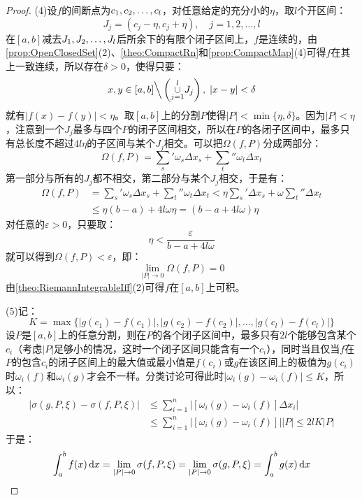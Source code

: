 \begin{proof}
	(4)设$f$的间断点为$c_1, c_2, \dots, c_{l}$，对任意给定的充分小的$\eta$，取$l$个开区间：
	\begin{equation*}
		J_j=(c_j-\eta,c_j+\eta),\quad j=1,2,\dots,l
	\end{equation*}
	在$[a,b]$减去$J_1, J_2, \dots, J_{l}$后所余下的有限个闭子区间上，$f$是连续的，由\cref{prop:OpenClosedSet}(2)、\cref{theo:CompactRn}和\cref{prop:CompactMap}(4)可得$f$在其上一致连续，所以存在$\delta>0$，使得只要：
	\begin{equation*}
		x,y\in[a,b]\Big\backslash\left(\underset{j=1}{\overset{l}{\cup}}J_j\right),\;|x-y|<\delta
	\end{equation*}
	就有$|f(x)-f(y)|<\eta$。取$[a,b]$上的分割$P$使得$|P|<\min\{\eta,\delta\}$。因为$|P|<\eta$，注意到一个$J_j$最多与四个$P$的闭子区间相交，所以在$P$的各闭子区间中，最多只有总长度不超过$4l\eta$的子区间与某个$J_j$相交。可以把$\Omega(f,P)$分成两部分：
	\begin{equation*}
		\Omega(f,P)=\sum_s'\omega_s\Delta x_s+\sum_t''\omega_t\Delta x_t
	\end{equation*}
	第一部分与所有的$J_j$都不相交，第二部分与某个$J_j$相交，于是有：
	\begin{align*}
		\Omega(f,P)&=\sum_s'\omega_s\Delta x_s+\sum_t''\omega_t\Delta x_t<\eta\sum_{s}'\Delta x_s+\omega\sum_{t}''\Delta x_t \\
		&\leqslant\eta(b-a)+4l\omega\eta=(b-a+4l\omega)\eta
	\end{align*}
	对任意的$\varepsilon>0$，只要取：
	\begin{equation*}
		\eta<\frac{\varepsilon}{b-a+4l\omega}
	\end{equation*}
	就可以得到$\Omega(f,P)<\varepsilon$，即：
	\begin{equation*}
		\lim_{|P|\to0}\Omega(f,P)=0
	\end{equation*}
	由\cref{theo:RiemannIntegrableIff}(2)可得$f$在$[a,b]$上可积。\par
	(5)记：
	\begin{equation*}
		K=\max\{|g(c_1)-f(c_1)|,|g(c_2)-f(c_2)|,\dots,|g(c_l)-f(c_l)|\}
	\end{equation*}
	设$P$是$[a,b]$上的任意分割，则在$P$的各个闭子区间中，最多只有$2l$个能够包含某个$c_i$（考虑$|P|$足够小的情况，这时一个闭子区间只能含有一个$c_i$），同时当且仅当$f$在$P$的包含$c_i$的闭子区间上的最大值或最小值是$f(c_i)$或$g$在该区间上的极值为$g(c_i)$时$\omega_i(f)$和$\omega_i(g)$才会不一样。分类讨论可得此时$|\omega_i(g)-\omega_i(f)|\leqslant K$，所以：
	\begin{align*}
		|\sigma(g,P,\xi)-\sigma(f,P,\xi)|&\leqslant\sum_{i=1}^{n}|[\omega_i(g)-\omega_i(f)]\Delta x_i| \\
		&\leqslant\sum_{i=1}^{n}|[\omega_i(g)-\omega_i(f)]||P|\leqslant2lK|P|
	\end{align*}
	于是：
	\begin{equation*}
		\int_{a}^bf(x)\mathop{}\!\mathrm{d} x=\lim_{|P|\to0}\sigma(f,P,\xi)=\lim_{|P|\to0}\sigma(g,P,\xi)=\int_{a}^bg(x)\mathop{}\!\mathrm{d} x\qedhere
	\end{equation*}
\end{proof}

